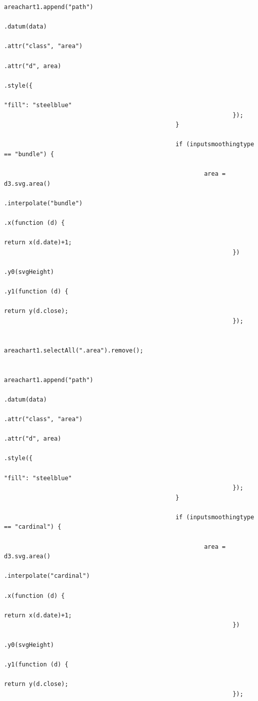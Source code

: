 \begin{lstlisting}[gobble=28]
                                                        areachart1.append("path")
                                                                .datum(data)
                                                                .attr("class", "area")
                                                                .attr("d", area)
                                                                .style({
                                                                        "fill": "steelblue"
                                                                });
                                                }

                                                if (inputsmoothingtype == "bundle") {

                                                        area = d3.svg.area()
                                                                .interpolate("bundle")
                                                                .x(function (d) {
                                                                        return x(d.date)+1;
                                                                })
                                                                .y0(svgHeight)
                                                                .y1(function (d) {
                                                                        return y(d.close);
                                                                });

                                                        areachart1.selectAll(".area").remove();

                                                        areachart1.append("path")
                                                                .datum(data)
                                                                .attr("class", "area")
                                                                .attr("d", area)
                                                                .style({
                                                                        "fill": "steelblue"
                                                                });
                                                }

                                                if (inputsmoothingtype == "cardinal") {

                                                        area = d3.svg.area()
                                                                .interpolate("cardinal")
                                                                .x(function (d) {
                                                                        return x(d.date)+1;
                                                                })
                                                                .y0(svgHeight)
                                                                .y1(function (d) {
                                                                        return y(d.close);
                                                                });


\end{lstlisting}
